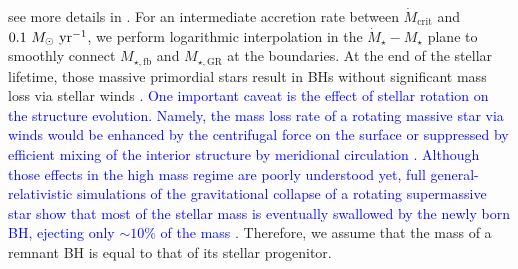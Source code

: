 \documentclass[twocolumn, twocolappendix]{aastex63}
\newcommand{\Msunyr}{M_\odot~{\rm yr}^{-1}}
\newcommand{\Mdot}{\dot{M}}
\newcommand{\blue}[1]{\textcolor{blue}{ #1}}
\begin{document}
\begin{CJK*}{UTF8}{gbsn}
\begin{equation}
\end{equation}
%
see more details in \cite{2021ApJ...917...60L}.
For an intermediate accretion rate between $\Mdot_\mathrm{crit}$ and $0.1~\Msunyr$, 
we perform logarithmic interpolation in the $\Mdot_\star - M_\star$ plane to smoothly connect 
$M_{\star, \mathrm{fb}}$ and $M_{\star, \mathrm{GR}}$ at the boundaries.
At the end of the stellar lifetime, those massive primordial stars result in BHs without significant mass loss 
via stellar winds \citep{2003ApJ...591..288H,2015MNRAS.451.4086S}.
\blue{One important caveat is the effect of stellar rotation on the structure evolution.
Namely, the mass loss rate of a rotating massive star via winds would be enhanced by the centrifugal force on the surface
or suppressed by efficient mixing of the interior structure by meridional circulation \citep[see][references therein]{2008A&A...489..685E,2012A&A...542A.113Y}.
Although those effects in the high mass regime are poorly understood yet, full general-relativistic simulations of the gravitational collapse of a rotating supermassive star 
show that most of the stellar mass is eventually swallowed by the newly born BH, ejecting only $\sim 10\%$ of the mass \citep{2002ApJ...572L..39S,2016PhRvD..94b1501S}.}
Therefore, we assume that the mass of a remnant BH is equal to that of its stellar progenitor.



\end{CJK*}
\end{document}
